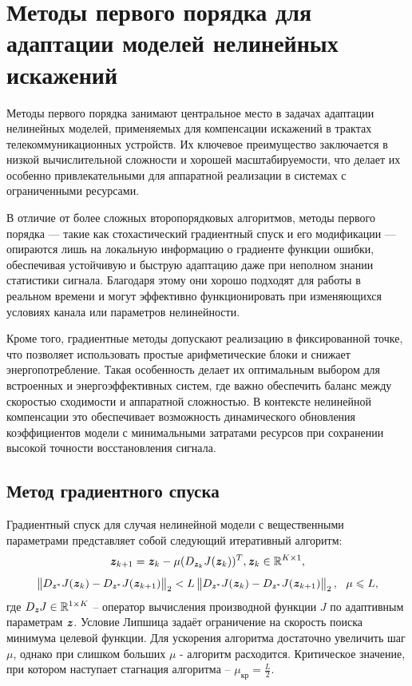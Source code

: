 \section{Методы первого порядка для адаптации моделей нелинейных искажений}

Методы первого порядка \cite{polyak_optimiz} занимают центральное место в задачах адаптации нелинейных моделей, применяемых для компенсации искажений в трактах телекоммуникационных устройств. Их ключевое преимущество заключается в низкой вычислительной сложности и хорошей масштабируемости, что делает их особенно привлекательными для аппаратной реализации в системах с ограниченными ресурсами.

В отличие от более сложных второпорядковых алгоритмов, методы первого порядка — такие как стохастический градиентный спуск и его модификации — опираются лишь на локальную информацию о градиенте функции ошибки, обеспечивая устойчивую и быструю адаптацию даже при неполном знании статистики сигнала. Благодаря этому они хорошо подходят для работы в реальном времени и могут эффективно функционировать при изменяющихся условиях канала или параметров нелинейности.

Кроме того, градиентные методы допускают реализацию в фиксированной точке, что позволяет использовать простые арифметические блоки и снижает энергопотребление. Такая особенность делает их оптимальным выбором для встроенных и энергоэффективных систем, где важно обеспечить баланс между скоростью сходимости и аппаратной сложностью. В контексте нелинейной компенсации это обеспечивает возможность динамического обновления коэффициентов модели с минимальными затратами ресурсов при сохранении высокой точности восстановления сигнала.

\subsection{Метод градиентного спуска} \label{subsec:grad}

Градиентный спуск для случая нелинейной модели с вещественными параметрами представляет собой следующий итеративный алгоритм:
\begin{equation}
	\textbf{\textit{z}}_{k+1}=\textbf{\textit{z}}_{k}-\mu (D_{\textbf{\textit{z}}_k}J(\textbf{\textit{z}}_{k}))^T, \textbf{\textit{z}}_k\in\mathbb{R}^{K\times1},
	\label{grad_descent}
\end{equation}
\begin{equation}
	\begin{Vmatrix}
		D_{\bit{z}^*}J(\bit{z}_{k})-
		D_{\bit{z}^*}J(\bit{z}_{k+1})
	\end{Vmatrix}_2<
	L\begin{Vmatrix}
		D_{\bit{z}^*}J(\bit{z}_{k})-D_{\bit{z}^*}J(\bit{z}_{k+1})
	\end{Vmatrix}_2, \ \ 
	\mu\leqslant L,
	\label{lipshic_cond}
\end{equation}
где $D_{\textbf{\textit{z}}}J\in\mathbb{R}^{1\times K}$ -- оператор вычисления производной функции $J$ по адаптивным параметрам $\textbf{\textit{z}}$. Условие Липшица \cite{polyak_optimiz} задаёт ограничение на скорость поиска минимума целевой функции. Для ускорения алгоритма достаточно увеличить шаг $\mu$, однако при слишком больших $\mu$ - алгоритм расходится. Критическое значение, при котором наступает стагнация алгоритма -- $\mu_{кр}=\frac{L}{2}$.


